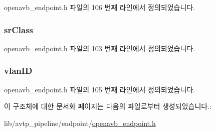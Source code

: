 openavb\+\_\+endpoint.\+h 파일의 106 번째 라인에서 정의되었습니다.

\subsubsection[{\texorpdfstring{sr\+Class}{srClass}}]{ sr\+Class}\hypertarget{structopenavb_endpoint_params___talker_callback__t_a0ce524f0210a76139ed0aa1ae3ff24f4}{}\label{structopenavb_endpoint_params___talker_callback__t_a0ce524f0210a76139ed0aa1ae3ff24f4}


openavb\+\_\+endpoint.\+h 파일의 103 번째 라인에서 정의되었습니다.

\subsubsection[{\texorpdfstring{vlan\+ID}{vlanID}}]{ vlan\+ID}\hypertarget{structopenavb_endpoint_params___talker_callback__t_a6f9e150f3345cb797072070d8972aec8}{}\label{structopenavb_endpoint_params___talker_callback__t_a6f9e150f3345cb797072070d8972aec8}


openavb\+\_\+endpoint.\+h 파일의 105 번째 라인에서 정의되었습니다.



이 구조체에 대한 문서화 페이지는 다음의 파일로부터 생성되었습니다.\+:\begin{DoxyCompactItemize}
\item 
lib/avtp\+\_\+pipeline/endpoint/\hyperlink{openavb__endpoint_8h}{openavb\+\_\+endpoint.\+h}\end{DoxyCompactItemize}
